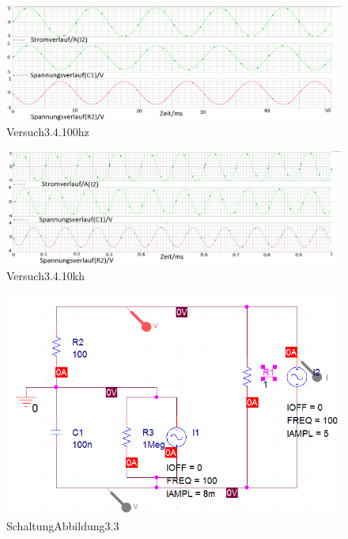 \documentclass[a4paper]{article}
\begin{document}
\vspace{2cm}
\begin{figure}
\vspace{1cm}
\hspace{-4.5cm}
\includegraphics[scale=0.5]{Versuch34100hz}
\caption{Versuch3.4.100hz}
\end{figure}


\vspace{2cm}
\begin{figure}
\vspace{2.5cm}
\hspace{-4.5cm}
\includegraphics[scale=0.5]{Versuch3410kh}
\caption{Versuch3.4.10kh}
\end{figure}

\vspace{5cm}
\begin{figure}
\hspace{-4.5cm}
\includegraphics[scale=1.2]{SchaltungAbbildung33}
\caption{SchaltungAbbildung3.3}
\end{figure}
\end{document}

